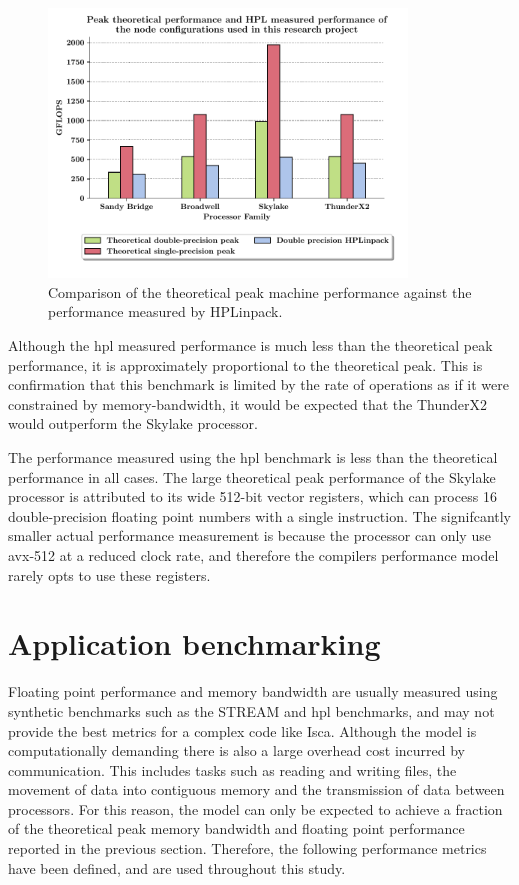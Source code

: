 \documentclass[a4paper,11pt]{report}
\begin{document}
\begin{figure}[htbp]
\begin{center}
\includegraphics[width=0.85\textwidth]{img/hpl.pdf}
\caption[High performance Linpack benchmark]{Comparison of the theoretical peak machine performance against the performance measured by HPLinpack. }
\label{fig:hpl}
\end{center}
\end{figure}
\par
Although the \gls{hpl} measured performance is much less than the theoretical peak performance, it is approximately proportional to the theoretical peak. This is confirmation that this benchmark is limited by the rate of operations as if it were constrained by memory-bandwidth, it would be expected that the ThunderX2 would outperform the Skylake processor.
\par
The performance measured using the \gls{hpl} benchmark is less than the theoretical performance in all cases. The large theoretical peak performance of the Skylake processor is attributed to its wide 512-bit vector registers, which can process 16 double-precision floating point numbers with a single instruction. The signifcantly smaller actual performance measurement is because the processor can only use \gls{avx}-512 at a reduced clock rate, and therefore the compilers performance model rarely opts to use these registers. 

\section{Application benchmarking}
\label{sec:app-benchmarking}
Floating point performance and memory bandwidth are usually measured using synthetic benchmarks such as the STREAM and \gls{hpl} benchmarks, and may not provide the best metrics for a complex code like Isca. Although the model is computationally demanding there is also a large overhead cost incurred by communication. This includes tasks such as reading and writing files, the movement of data into contiguous memory and the transmission of data between processors. For this reason, the model can only be expected to achieve a fraction of the theoretical peak memory bandwidth and floating point performance reported in the previous section. Therefore, the following performance metrics have been defined, and are used throughout this study.
\end{document}
